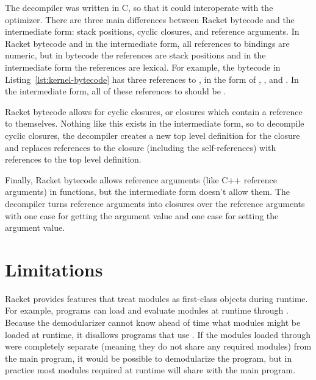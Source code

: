The decompiler was written in C, so that it could interoperate with the optimizer.
There are three main differences between Racket bytecode and the intermediate form: stack positions, cyclic closures, and reference arguments.
In Racket bytecode and in the intermediate form, all references to bindings are numeric, but in bytecode the references are stack positions and in the intermediate form the references are lexical.
For example, the bytecode in Listing~\ref{lst:kernel-bytecode} has three references to , in the form of , , and . 
In the intermediate form, all of these references to  should be .

Racket bytecode allows for cyclic closures, or closures which contain a reference to themselves.
Nothing like this exists in the intermediate form, so to decompile cyclic closures, the decompiler creates a new top level definition for the closure and replaces references to the closure (including the self-references) with references to the top level definition.

Finally, Racket bytecode allows reference arguments (like C++ reference arguments) in functions, but the intermediate form doesn't allow them.
The decompiler turns reference arguments into  closures over the reference arguments with one case for getting the argument value and one case for setting the argument value. 

\section{Limitations}

Racket provides features that treat modules as first-class objects during runtime. 
For example, programs can load and evaluate modules at runtime through . 
Because the demodularizer cannot know ahead of time what modules might be loaded at runtime, it disallows programs that use .
If the modules loaded through  were completely separate (meaning they do not share any required modules) from the main program, it would be possible to demodularize the program, but in practice most modules required at runtime will share with the main program.

